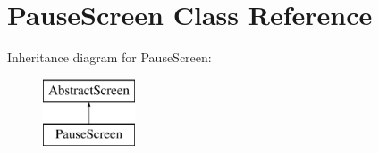 \hypertarget{class_pause_screen}{}\section{Pause\+Screen Class Reference}
\label{class_pause_screen}
Inheritance diagram for Pause\+Screen\+:\begin{figure}[H]
\begin{center}
\leavevmode
\includegraphics[height=2.000000cm]{class_pause_screen}
\end{center}
\end{figure}
